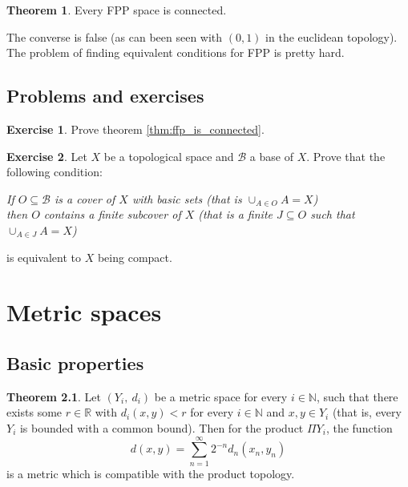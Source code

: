 \documentclass[a4paper]{book}
\theoremstyle{definition}
\newtheorem{theorem}{Theorem}[section]
\theoremstyle{ejemplo}
\newtheorem{exercise}{Exercise}[chapter]
\theoremstyle{demostracion}
\newcommand{\reales}{\mathbb{R}}
\newcommand{\naturales}{\mathbb{N}}
\begin{document}
\begin{theorem} \label{thm:ffp_is_connected}
	Every FPP space is connected.
\end{theorem}

The converse is false (as can been seen with $(0, 1)$ in the euclidean topology).\\ 
The problem of finding equivalent conditions for FPP is pretty hard.

\section{Problems and exercises}
\begin{exercise}
	Prove theorem \eqref{thm:ffp_is_connected}.
\end{exercise}

\begin{exercise}\label{exer:space_is_compact_base}
	Let $X$ be a topological space and $\mathcal{B}$ a base of $X$. Prove that the following condition:\\ 
	
	\begin{center}
		\textit{If $O \subseteq \mathcal{B}$ is a cover of $X$ with basic sets (that is $\cup_{A \in O} A = X$)\\ then $O$ contains a finite subcover of $X$ (that is a finite $J \subseteq O$ such that $\cup_{A \in J} A = X$)}
	\end{center}
	
	is equivalent to $X$ being compact.
\end{exercise}






\chapter{Metric spaces}
\section{Basic properties}

\begin{theorem}\label{thm_metric_infprod}
	Let $(Y_i,\ d_i)$ be a metric space for every $i \in \naturales$, such that there exists some $r \in \reales$ with $d_i(x, y) < r$ for every $i \in \naturales$ and $x, y \in Y_i$ (that is, every $Y_i$ is bounded with a common bound). Then for the product $\Pi Y_i$, the function
	\begin{equation*}
		d(x, y) = \sum_{n = 1}^{\infty} 2^{-n} d_n(x_n, y_n)
	\end{equation*}
	is a metric which is compatible with the product topology.
\end{theorem}
\end{document}
